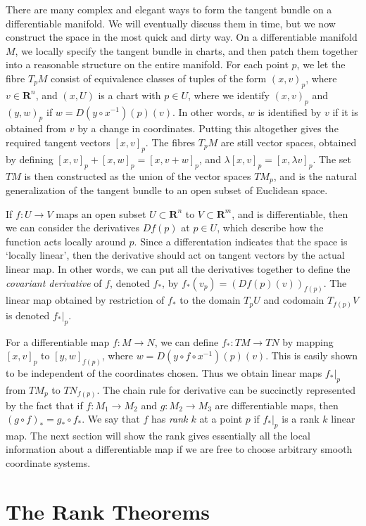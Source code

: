 There are many complex and elegant ways to form the tangent bundle on a differentiable manifold. We will eventually discuss them in time, but we now construct the space in the most quick and dirty way. On a differentiable manifold $M$, we locally specify the tangent bundle in charts, and then patch them together into a reasonable structure on the entire manifold. For each point $p$, we let the fibre $T_pM$ consist of equivalence classes of tuples of the form $(x,v)_p$, where $v \in \mathbf{R}^n$, and $(x,U)$ is a chart with $p \in U$, where we identify $(x,v)_p$ and $(y,w)_p$ if $w = D(y \circ x^{-1})(p)(v)$. In other words, $w$ is identified by $v$ if it is obtained from $v$ by a change in coordinates. Putting this altogether gives the required tangent vectors $[x,v]_p$. The fibres $T_pM$ are still vector spaces, obtained by defining $[x,v]_p + [x,w]_p = [x,v+w]_p$, and $\lambda [x,v]_p = [x,\lambda v]_p$. The set $TM$ is then constructed as the union of the vector spaces $TM_p$, and is the natural generalization of the tangent bundle to an open subset of Euclidean space.

If $f: U \to V$ maps an open subset $U \subset \mathbf{R}^n$ to $V \subset \mathbf{R}^m$, and is differentiable, then we can consider the derivatives $Df(p)$ at $p \in U$, which describe how the function acts locally around $p$. Since a differentation indicates that the space is `locally linear', then the derivative should act on tangent vectors by the actual linear map. In other words, we can put all the derivatives together to define the \emph{covariant derivative} of $f$, denoted $f_*$, by $f_*(v_p) = (Df(p)(v))_{f(p)}$. The linear map obtained by restriction of $f_*$ to the domain $T_p U$ and codomain $T_{f(p)} V$ is denoted $f_*|_p$.

For a differentiable map $f:M \to N$, we can define $f_*: TM \to TN$ by mapping $[x,v]_p$ to $[y,w]_{f(p)}$, where $w = D(y \circ f \circ x^{-1})(p)(v)$. This is easily shown to be independent of the coordinates chosen. Thus we obtain linear maps $f_*|_p$ from $TM_p$ to $TN_{f(p)}$. The chain rule for derivative can be succinctly represented by the fact that if $f: M_1 \to M_2$ and $g: M_2 \to M_3$ are differentiable maps, then $(g \circ f)_* = g_* \circ f_*$. We say that $f$ has \emph{rank $k$} at a point $p$ if $f_*|_p$ is a rank $k$ linear map. The next section will show the rank gives essentially all the local information about a differentiable map if we are free to choose arbitrary smooth coordinate systems.


\section{The Rank Theorems}

